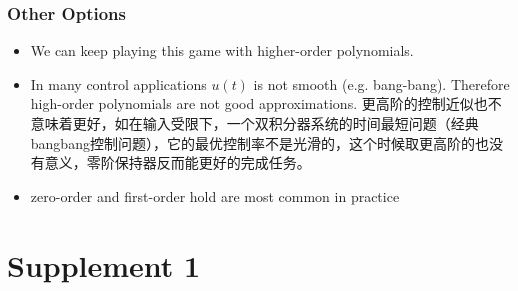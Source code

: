 \subsubsection{Other Options}
\begin{itemize}
    \item We can keep playing this game with higher-order polynomials.
    \item In many control applications $u(t)$ is not smooth (e.g. bang-bang). Therefore high-order polynomials are not good approximations. 更高阶的控制近似也不意味着更好，如在输入受限下，一个双积分器系统的时间最短问题（经典bangbang控制问题），它的最优控制率不是光滑的，这个时候取更高阶的也没有意义，零阶保持器反而能更好的完成任务。
    \item zero-order and first-order hold are most common in practice
\end{itemize}

\section{Supplement 1}
